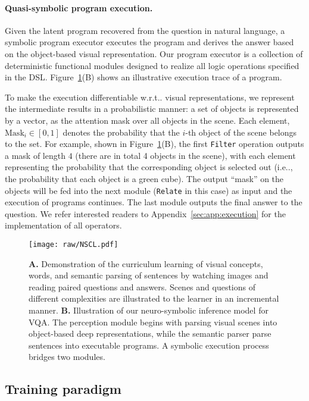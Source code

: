 \documentclass{article} \usepackage{iclr2019_conference,times}
\makeatletter
\newcommand{\fig}[1]{Figure~\ref{#1}}
\DeclareRobustCommand\onedot{\futurelet\@let@token\@onedot}
\def\@onedot{\ifx\@let@token.\else.\null\fi\xspace}
\def\ie{i.e\onedot} \def\Ie{I.e\onedot}
\def\wrt{w.r.t\onedot} \def\dof{d.o.f\onedot}
\newcommand{\myparagraph}[1]{\vspace{-3pt}\paragraph{#1}}
\makeatother
\begin{document}
\myparagraph{Quasi-symbolic program execution.}

Given the latent program recovered from the question in natural language, a symbolic program executor executes the program and derives the answer based on the object-based visual representation. Our program executor is a collection of deterministic functional modules designed to realize all logic operations specified in the DSL. \fig{fig:nscl}(B) shows an illustrative execution trace of a program.

To make the execution differentiable \wrt visual representations, we represent the intermediate results in a probabilistic manner: a set of objects is represented by a vector, as the attention mask over all objects in the scene. Each element, $\mathrm{Mask}_i \in [0, 1]$ denotes the probability that the $i$-th object of the scene belongs to the set.
For example, shown in \fig{fig:nscl}(B), the first \texttt{Filter} operation outputs a mask of length $4$ (there are in total 4 objects in the scene), with each element representing the probability that the corresponding object is selected out (\ie, the probability that each object is a green cube). The output ``mask'' on the objects will be fed into the next module (\texttt{Relate} in this case) as input and the execution of programs continues. The last module outputs the final answer to the question. We refer interested readers to Appendix~\ref{sec:app:execution} for the implementation of all operators.






\begin{figure}[t]
\centering
\texttt{[image: raw/NSCL.pdf]}
\vspace{-15pt}
\caption{{\bf A.} Demonstration of the curriculum learning of visual concepts, words, and semantic parsing of sentences by watching images and reading paired questions and answers. Scenes and questions of different complexities are illustrated to the learner in an incremental manner. {\bf B.} Illustration of our neuro-symbolic inference model for VQA. The perception module begins with parsing visual scenes into object-based deep representations, while the semantic parser parse sentences into executable programs. A symbolic execution process bridges two modules.}
\vspace{-5pt}
\label{fig:nscl}
\end{figure}
 
\subsection{Training paradigm}
\end{document}
